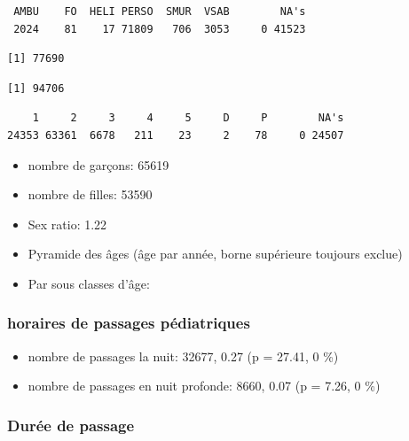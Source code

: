 \documentclass[]{article}
\begin{document}
\begin{verbatim}
 AMBU    FO  HELI PERSO  SMUR  VSAB        NA's 
 2024    81    17 71809   706  3053     0 41523 
\end{verbatim}

\begin{verbatim}
[1] 77690
\end{verbatim}

\begin{verbatim}
[1] 94706
\end{verbatim}

\begin{verbatim}
    1     2     3     4     5     D     P        NA's 
24353 63361  6678   211    23     2    78     0 24507 
\end{verbatim}

\begin{itemize}
\itemsep1pt\parskip0pt
\item
  nombre de garçons: 65619
\item
  nombre de filles: 53590
\item
  Sex ratio: 1.22
\item
  Pyramide des âges (âge par année, borne supérieure toujours exclue)
\item
  Par sous classes d'âge:
\end{itemize}

\subsubsection{horaires de passages
pédiatriques}\label{horaires-de-passages-pediatriques}

\begin{itemize}
\itemsep1pt\parskip0pt
\item
  nombre de passages la nuit: 32677, 0.27 (p = 27.41, 0 \%)
\item
  nombre de passages en nuit profonde: 8660, 0.07 (p = 7.26, 0 \%)
\end{itemize}

\subsubsection{Durée de passage}\label{duree-de-passage}
\end{document}
